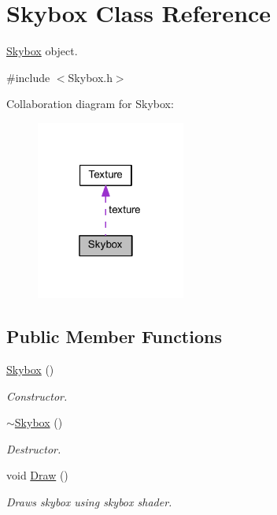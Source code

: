 \hypertarget{class_skybox}{}\section{Skybox Class Reference}
\label{class_skybox}


\mbox{\hyperlink{class_skybox}{Skybox}} object.  




{\ttfamily \#include $<$Skybox.\+h$>$}



Collaboration diagram for Skybox\+:\nopagebreak
\begin{figure}[H]
\begin{center}
\leavevmode
\includegraphics[width=139pt]{class_skybox__coll__graph}
\end{center}
\end{figure}
\subsection*{Public Member Functions}
\begin{DoxyCompactItemize}
\item 
\mbox{\hyperlink{class_skybox_a77a92db4492ed94ed4bd101b05ffb1f4}{Skybox}} ()
\begin{DoxyCompactList}\small\item\em Constructor. \end{DoxyCompactList}\item 
\mbox{\hyperlink{class_skybox_a62ad4c6b4b1965a0a6d8536a50d4c090}{$\sim$\+Skybox}} ()
\begin{DoxyCompactList}\small\item\em Destructor. \end{DoxyCompactList}\item 
void \mbox{\hyperlink{class_skybox_a8bf85652e4f0559530eb7a1f5ed87439}{Draw}} ()
\begin{DoxyCompactList}\small\item\em Draws skybox using skybox shader. \end{DoxyCompactList}\end{DoxyCompactItemize}
